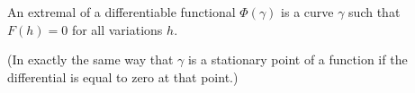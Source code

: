 An extremal of a differentiable functional $\Phi(\gamma)$ is a curve $\gamma$ such that $F(h) = 0$ for all variations $h$.

(In exactly the same way that $\gamma$ is a stationary point of a function if the differential is equal to zero at that point.)
